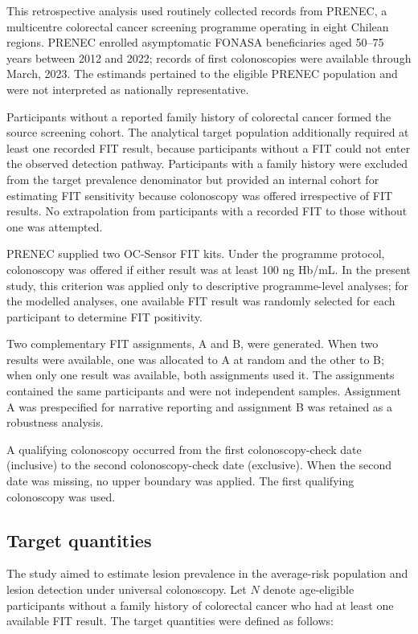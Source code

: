 \documentclass[10pt,a4paper]{article}
\begin{document}
This retrospective analysis used routinely collected records from PRENEC, a
multicentre colorectal cancer screening programme operating in eight Chilean
regions. PRENEC enrolled asymptomatic FONASA beneficiaries aged 50--75 years
between 2012 and 2022; records of first colonoscopies were available through
March, 2023. The estimands pertained to the eligible PRENEC population and
were not interpreted as nationally representative.

Participants without a reported family history of colorectal cancer formed
the source screening cohort. The analytical target population additionally
required at least one recorded FIT result, because participants without a FIT
could not enter the observed detection pathway. Participants with a family
history were excluded from the target prevalence denominator but provided an
internal cohort for estimating FIT sensitivity because colonoscopy was offered
irrespective of FIT results. No extrapolation from participants with a recorded
FIT to those without one was attempted.

PRENEC supplied two OC-Sensor FIT kits. Under the programme protocol,
colonoscopy was offered if either result was at least 100 ng Hb/mL. In the
present study, this criterion was applied only to descriptive programme-level
analyses; for the modelled analyses, one available FIT result was randomly
selected for each participant to determine FIT positivity.

Two complementary FIT assignments, A and B, were generated. When two results were available, one was allocated
to A at random and the other to B; when only one result was available, both
assignments used it. The assignments contained the same participants and
were not independent samples. Assignment A was prespecified for narrative
reporting and assignment B was retained as a robustness analysis.

A qualifying colonoscopy occurred from the first colonoscopy-check date
(inclusive) to the second colonoscopy-check date (exclusive). When the second
date was missing, no upper boundary was applied. The first qualifying
colonoscopy was used.



\subsection*{Target quantities}
The study aimed to estimate lesion prevalence in the average-risk population and lesion detection under universal colonoscopy. Let $N$ denote age-eligible participants without a family history of colorectal cancer who had at least one available FIT result. The target quantities were defined as follows:
\end{document}
